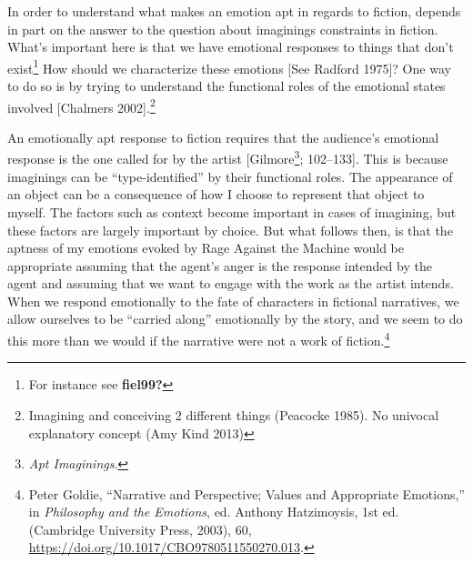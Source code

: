 \documentclass[
  12pt,
]{book}
\theoremstyle{definition}
\theoremstyle{definition}
\theoremstyle{definition}
\theoremstyle{definition}
\theoremstyle{remark}
\begin{document}
In order to understand what makes an emotion apt in regards to fiction, depends in part on the answer to the question about imaginings constraints in fiction. What's important here is that we have emotional responses to things that don't exist\footnote{For instance see \textbf{fiel99?}} How should we characterize these emotions {[}See Radford 1975{]}? One way to do so is by trying to understand the functional roles of the emotional states involved {[}Chalmers 2002{]}.\footnote{Imagining and conceiving 2 different things (Peacocke 1985). No univocal explanatory concept (Amy Kind 2013)}

An emotionally apt response to fiction requires that the audience's emotional response is the one called for by the artist {[}Gilmore\footnote{\emph{Apt {Imaginings}}.}; 102--133{]}. This is because imaginings can be ``type-identified'' by their functional roles. The appearance of an object can be a consequence of how I choose to represent that object to myself. The factors such as context become important in cases of imagining, but these factors are largely important by choice. But what follows then, is that the aptness of my emotions evoked by Rage Against the Machine would be appropriate assuming that the agent's anger is the response intended by the agent and assuming that we want to engage with the work as the artist intends. When we respond emotionally to the fate of characters in fictional narratives, we allow ourselves to be ``carried along'' emotionally by the story, and we seem to do this more than we would if the narrative were not a work of fiction.\footnote{Peter Goldie, {``Narrative and {Perspective}; {Values} and {Appropriate Emotions},''} in \emph{Philosophy and the {Emotions}}, ed. Anthony Hatzimoysis, 1st ed. (Cambridge University Press, 2003), 60, \url{https://doi.org/10.1017/CBO9780511550270.013}.}
\end{document}
